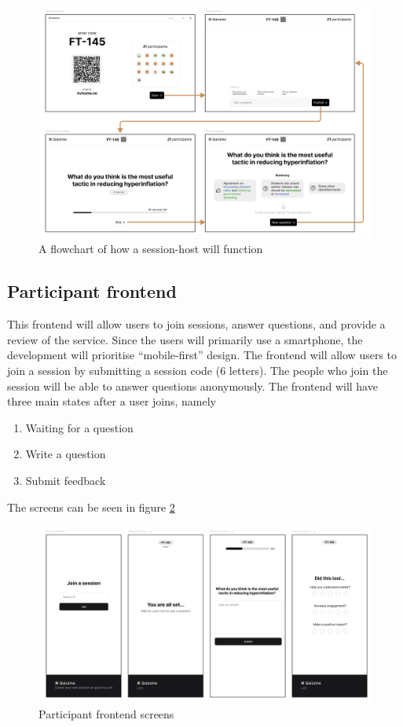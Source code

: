 \begin{figure}[h!]
    \centering
    \includegraphics[width=1\linewidth]{figures//c5/session-frontend.png}
    \caption{A flowchart of how a session-host will function}
    \label{fig:session-host-flowchart}
\end{figure}

\subsection{Participant frontend}
This frontend will allow users to join sessions, answer questions, and provide a review of the service. Since the users will primarily use a smartphone, the development will prioritise ``mobile-first'' design. The frontend will allow users to join a session by submitting a session code (6 letters). The people who join the session will be able to answer questions anonymously. The frontend will have three main states after a user joins, namely 

\begin{enumerate}
    \item Waiting for a question
    \item Write a question
    \item Submit feedback
\end{enumerate}

The screens can be seen in figure \ref{fig:participant-frontend}


\begin{figure}[h!]
    \centering
    \includegraphics[width=1\linewidth]{figures//c5/user-frontend.png}
    \caption{Participant frontend screens}
    \label{fig:participant-frontend}
\end{figure}


